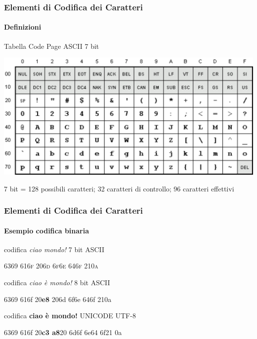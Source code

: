 \begin{frame}
	\frametitle{Elementi di Codifica dei Caratteri}
	\framesubtitle{Definizioni}
	\addtocounter{nframe}{1}

	\begin{block}{Tabella Code Page ASCII 7 bit}
		\begin{center}
			\includegraphics[width=.9\textwidth]{imgs/ascii-67.pdf}
		\end{center}

	\end{block}
	\begin{tiny}
		\begin{center}
			7 bit = 128 possibili caratteri; 32 caratteri di controllo; 96 caratteri effettivi
		\end{center}

	\end{tiny}

\end{frame}

\begin{frame}
	\frametitle{Elementi di Codifica dei Caratteri}
	\framesubtitle{Esempio codifica binaria}
	\addtocounter{nframe}{1}

	\begin{block}{codifica \textit{ciao mondo!} 7 bit ASCII}
		\begin{center}
			\textsc{6369 616f 206d 6f6e 646f 210a}
		\end{center}
	\end{block}

	\begin{block}{codifica \textit{ciao è mondo!} 8 bit ASCII}
		\begin{center}
			\textmd{6369 616f 20\textbf{e8} 206d 6f6e 646f 210a       }
		\end{center}
	\end{block}

	\begin{block}{codifica \textbf{ciao è mondo!} UNICODE UTF-8}
		\begin{center}
			6369 616f 20\textbf{c3 a8}20 6d6f 6e64 6f21 0a
		\end{center}
	\end{block}

\end{frame}

